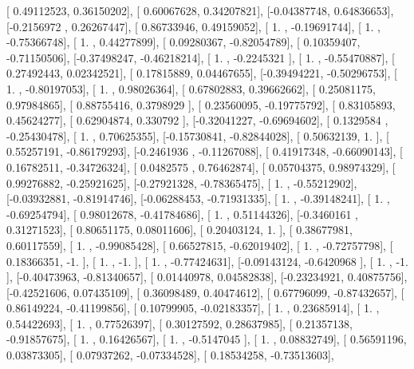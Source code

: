 \documentclass{article}
\begin{document}
       [ 0.49112523,  0.36150202],
       [ 0.60067628,  0.34207821],
       [-0.04387748,  0.64836653],
       [-0.2156972 ,  0.26267447],
       [ 0.86733946,  0.49159052],
       [ 1.        , -0.19691744],
       [ 1.        , -0.75366748],
       [ 1.        ,  0.44277899],
       [ 0.09280367, -0.82054789],
       [ 0.10359407, -0.71150506],
       [-0.37498247, -0.46218214],
       [ 1.        , -0.2245321 ],
       [ 1.        , -0.55470887],
       [ 0.27492443,  0.02342521],
       [ 0.17815889,  0.04467655],
       [-0.39494221, -0.50296753],
       [ 1.        , -0.80197053],
       [ 1.        ,  0.98026364],
       [ 0.67802883,  0.39662662],
       [ 0.25081175,  0.97984865],
       [ 0.88755416,  0.3798929 ],
       [ 0.23560095, -0.19775792],
       [ 0.83105893,  0.45624277],
       [ 0.62904874,  0.330792  ],
       [-0.32041227, -0.69694602],
       [ 0.1329584 , -0.25430478],
       [ 1.        ,  0.70625355],
       [-0.15730841, -0.82844028],
       [ 0.50632139,  1.        ],
       [ 0.55257191, -0.86179293],
       [-0.2461936 , -0.11267088],
       [ 0.41917348, -0.66090143],
       [ 0.16782511, -0.34726324],
       [ 0.0482575 ,  0.76462874],
       [ 0.05704375,  0.98974329],
       [ 0.99276882, -0.25921625],
       [-0.27921328, -0.78365475],
       [ 1.        , -0.55212902],
       [-0.03932881, -0.81914746],
       [-0.06288453, -0.71931335],
       [ 1.        , -0.39148241],
       [ 1.        , -0.69254794],
       [ 0.98012678, -0.41784686],
       [ 1.        ,  0.51144326],
       [-0.3460161 ,  0.31271523],
       [ 0.80651175,  0.08011606],
       [ 0.20403124,  1.        ],
       [ 0.38677981,  0.60117559],
       [ 1.        , -0.99085428],
       [ 0.66527815, -0.62019402],
       [ 1.        , -0.72757798],
       [ 0.18366351, -1.        ],
       [ 1.        , -1.        ],
       [ 1.        , -0.77424631],
       [-0.09143124, -0.6420968 ],
       [ 1.        , -1.        ],
       [-0.40473963, -0.81340657],
       [ 0.01440978,  0.04582838],
       [-0.23234921,  0.40875756],
       [-0.42521606,  0.07435109],
       [ 0.36098489,  0.40474612],
       [ 0.67796099, -0.87432657],
       [ 0.86149224, -0.41199856],
       [ 0.10799905, -0.02183357],
       [ 1.        ,  0.23685914],
       [ 1.        ,  0.54422693],
       [ 1.        ,  0.77526397],
       [ 0.30127592,  0.28637985],
       [ 0.21357138, -0.91857675],
       [ 1.        ,  0.16426567],
       [ 1.        , -0.5147045 ],
       [ 1.        ,  0.08832749],
       [ 0.56591196,  0.03873305],
       [ 0.07937262, -0.07334528],
       [ 0.18534258, -0.73513603],
\end{document}
